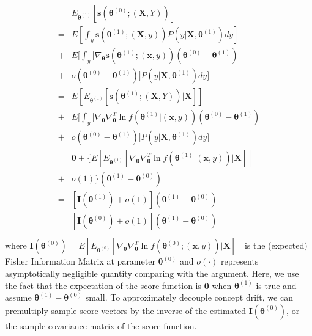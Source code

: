 \documentclass[twoside,11pt]{article}
\begin{document}
\begin{align}
\begin{aligned}
& E _{\bm { \theta}^{ (1)}}[\bm{s}(\bm { \theta}^{ (0)}; (\bm {X}, Y))] \\
= & E[\int _{y} \bm{s}(\bm { \theta}^{ (1)}; (\bm {X}, y))P (y| \bm {X}, \bm{\theta}^{ (1)}) d y ] \\ 
 +&  E[\int _{y} [  \nabla _{\bm { \theta}}{ \bm{s}(\bm { \theta}^{ (1)}; (\bm {x}, y))}(\bm { \theta}^ { (0)} - \bm { \theta} ^{ (1)}) \\ 
 +& o(\bm { \theta}^ { (0)} - \bm { \theta} ^{ (1)} ) ] P (y| \bm {X}, \bm{\theta}^{ (1)}) d y]\\ 
= & E[E _{\bm { \theta}^{ (1)}}[\bm{s}(\bm { \theta}^{ (1)}; (\bm {X}, Y))| \bm {X}]] \\
+ & E[\int _{y} [ \nabla_{\bm { \theta}} \nabla^T _{\bm { \theta}}{ \ln f(\bm { \theta}^{ (1)}| (\bm {x}, y))}(\bm { \theta}^ { (0)} - \bm { \theta} ^{ (1)}) \\
+ & o(\bm { \theta}^ { (0)}- \bm { \theta}^{ (1)})]P (y| \bm {X}, \bm{\theta}^{ (1)}) dy] \\
= & \bm{0} +  \{E[E _{\bm { \theta}^{ (1)}}[\nabla_{\bm { \theta}} \nabla ^T_{\bm { \theta}}{ \ln {f}(\bm { \theta}^{ (1)}| (\bm {x}, y))} | \bm {X}]] \\ + &o(1)\}(\bm { \theta}^{ (1)} - \bm { \theta}^ { (0)}) \\
= & [{\mathbf {I}}(\bm { \theta}^{ (1)})+ o(1)](\bm { \theta}^{ (1)} - \bm { \theta}^ { (0)}) \\
= & [{\mathbf {I}}(\bm { \theta}^{ (0)})+ o(1)](\bm { \theta}^{ (1)} - \bm { \theta}^ { (0)}) \\
\end{aligned}
\label{eqn:fisher_approx}
\end{align}
where {${\mathbf {I}}(\bm { \theta}^{ (0)})=E[E _{\bm { \theta}^{ (0)}}[\nabla_{\bm { \theta}} \nabla^T _{\bm { \theta}}{ \ln{f}(\bm { \theta}^{ (0)}; (\bm {x}, y))} | \bm {X}]]$} is the (expected) Fisher Information Matrix {at parameter $\bm { \theta} ^{ (0)}$} and $o(\cdot)$ represents asymptotically negligible quantity comparing with the argument. Here, we use the fact that the expectation of the score function is $\bm {0}$ when {$\bm { \theta}^{ (1)}$} is true and assume {$ \bm { \theta}^ { (1)} - \bm { \theta}^{ (0)} $} small. To approximately decouple concept drift, we can premultiply sample score vectors by {the} inverse of {the} estimated {${\mathbf {I}}(\bm { \theta}^{ (0)})$}, or the sample covariance matrix of {the score function.}
\end{document}
